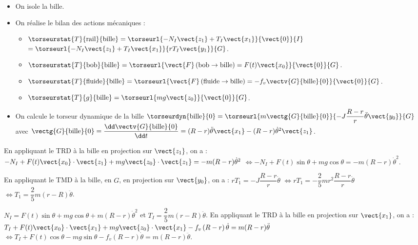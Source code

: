 \ifprof
\begin{itemize}
\item On isole la bille. 
\item On réalise le bilan des actions mécaniques :
\begin{itemize}
\item $\torseurstat{T}{\text{rail}}{\text{bille}} = \torseurl{-N_I\vect{z_1}+T_I\vect{x_1}}{\vect{0}}{I}$ $= \torseurl{-N_I\vect{z_1}+T_I\vect{x_1}}{rT_I\vect{y_1}}{G}$.
\item $\torseurstat{T}{\text{bob}}{\text{bille}} = \torseurl{\vect{F}\left(\text{bob} \rightarrow \text{bille} \right)=F(t)\vect{x_0}}{\vect{0}}{G}$.
\item $\torseurstat{T}{\text{fluide}}{\text{bille}} = \torseurl{\vect{F}\left(\text{fluide} \rightarrow \text{bille} \right)=-f_v\vectv{G}{\text{bille}}{0}}{\vect{0}}{G}$.
\item $\torseurstat{T}{g}{\text{bille}} = \torseurl{mg\vect{z_0}}{\vect{0}}{G}$.
\end{itemize}
\item On calcule le torseur dynamique de la bille $\torseurdyn{\text{bille}}{0}=\torseurl{m\vectg{G}{\text{bille}}{0}}{-J\dfrac{R-r}{r}\ddot{\theta}\vect{y_0}}{G}$ avec $\vectg{G}{\text{bille}}{0} = \dfrac{\dd \vectv{G}{\text{bille}}{0}}{\dd t} = (R-r)\ddot{\theta}\vect{x_1} - (R-r)\dot{\theta}^2\vect{z_1}$.
\end{itemize}

En appliquant le TRD à la bille en projection sur $\vect{z_1}$, on a : 
$-N_I+F(t)\vect{x_0}\cdot\vect{z_1} +mg\vect{z_0}\cdot\vect{z_1} = - m(R-r)\dot{\theta}^2$
$\Longleftrightarrow -N_I+F(t)\sin\theta +mg\cos\theta = - m(R-r)\dot{\theta}^2 $.


En appliquant le TMD à la bille, en $G$, en projection sur $\vect{y_0}$, on a : 
$rT_1 = -J\dfrac{R-r}{r}\ddot{\theta}$
$\Longleftrightarrow rT_1 = -\dfrac{2}{5}mr^2 \dfrac{R-r}{r}\ddot{\theta}$
$\Longleftrightarrow T_1 = \dfrac{2}{5}m(r-R)\ddot{\theta}$.

\else
\fi

$N_I = F(t)\sin \theta +mg \cos \theta + m\left(R-r\right)\dot{\theta}^2$
et $T_I = \dfrac{2}{5}m\left(r-R\right)\ddot{\theta}$.
\ifprof
En appliquant le TRD à la bille en projection sur $\vect{x_1}$, on a : 
$T_I+F(t)\vect{x_0}\cdot\vect{x_1} +mg\vect{z_0}\cdot\vect{x_1}-f_v \left(R-r\right)\dot{\theta} =  m(R-r)\ddot{\theta}$
$\Longleftrightarrow  T_I+F(t)\cos\theta-mg\sin\theta -f_v \left(R-r\right)\dot{\theta} =  m(R-r)\ddot{\theta}$.

